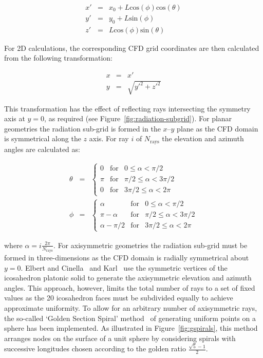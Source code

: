 \begin{eqnarray}
 x' &=& x_0 + L \text{cos} \left ( \phi \right ) \text{cos} \left ( \theta \right ) \\
 y' &=& y_0 + L \text{sin} \left ( \phi \right ) \\
 z' &=& L \text{cos} \left ( \phi \right ) \text{sin} \left ( \theta \right )
\end{eqnarray}

\noindent For 2D calculations, the corresponding CFD grid coordinates are then calculated from the following transformation:

\begin{eqnarray}
 x &=& x' \\
 y &=& \sqrt{y'^2 + z'^2}
\end{eqnarray}

\noindent This transformation has the effect of reflecting rays intersecting the symmetry axis at $y=0$, as required (see Figure~\ref{fig:radiation-subgrid}).
For planar geometries the radiation sub-grid is formed in the $x$--$y$ plane as the CFD domain is symmetrical along the $z$ axis.
For ray $i$ of $N_\text{rays}$ the elevation and azimuth angles are calculated as:

\begin{eqnarray}
 \theta &=& \left \lbrace \begin{array}{ccc} 0 & \text{for} & 0 \leq \alpha < \pi/2  \\ 
 									    \pi & \text{for} & \pi/2 \leq \alpha < 3\pi/2 \\
									     0 & \text{for} & 3\pi/2 \leq \alpha < 2\pi \end{array} \right . \\
 \phi &=& \left \lbrace \begin{array}{ccc} \alpha & \text{for} & 0 \leq \alpha < \pi/2  \\ 
 									    \pi - \alpha & \text{for} & \pi/2 \leq \alpha < 3\pi/2 \\
									     \alpha - \pi/2 & \text{for} & 3\pi/2 \leq \alpha < 2\pi \end{array} \right .
\end{eqnarray}

\noindent where  $\alpha = i \frac{2\pi}{N_\text{rays}}$.
For axisymmetric geometries the radiation sub-grid must be formed in three-dimensions as the CFD domain is radially symmetrical about $y=0$.
Elbert and Cinella~\cite{elbert_cinnella} and Karl~\cite{karl2001} use the symmetric vertices of the icosahedron platonic solid to generate the axisymmetric elevation and azimuth angles.
This approach, however, limits the total number of rays to a set of fixed values as the 20 icosahedron faces must be subdivided equally to achieve approximate uniformity.
To allow for an arbitrary number of axisymmetric rays, the so-called `Golden Section Spiral' method~\cite{Spiral} of generating uniform points on a sphere has been implemented.
As illustrated in Figure~\ref{fig:gspirals}, this method arranges nodes on the surface of a unit sphere by considering spirals with successive longitudes chosen according to the golden ratio $\frac{\sqrt{5}-1}{2}$.

